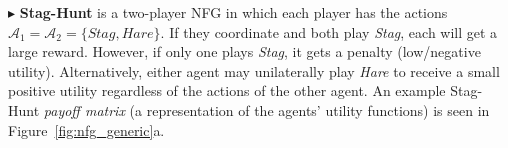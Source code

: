 \documentclass{ecai}
\theoremstyle{plain}
\theoremstyle{definition}
\theoremstyle{remark}
\begin{document}
   

$\blacktriangleright$ \textbf{Stag-Hunt}\label{sec:foundations:gt:nfg:sh} is a two-player NFG in which each player has the actions $\mathcal{A}_1  = \mathcal{A}_2 = \{Stag, Hare\}$. 
If they coordinate and both play \textit{Stag}, each will get a large reward. However, if only one plays \textit{Stag}, it gets a penalty (low/negative utility). Alternatively, either agent may unilaterally play \textit{Hare} to receive a small positive utility regardless of the actions of the other agent. An example Stag-Hunt \textit{payoff matrix} (a representation of the agents' utility functions) is seen in Figure~\ref{fig:nfg_generic}a.
\end{document}
